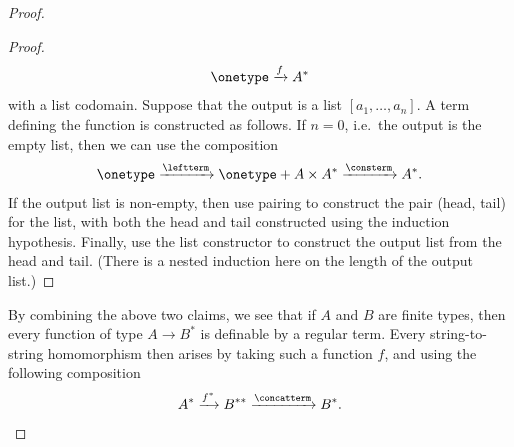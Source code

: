\begin{proof}
\begin{proof}
\begin{align*}
\onetype \xrightarrow f A^*
\end{align*}
with a list codomain. Suppose that the output is a list $[a_1,\ldots,a_n]$. A term defining the function is constructed as follows. If $n=0$, i.e.~the output is the empty list, then we can use the composition
\begin{align*}
\onetype \xrightarrow{\leftterm} \onetype + A \times A^* \xrightarrow {\consterm} A^*.
\end{align*}
If the output list is non-empty, then use pairing to construct the pair (head, tail) for the list, with both the head and tail constructed using the induction hypothesis. Finally, use the list constructor to construct the output list from the head and tail. (There is a nested induction here on the length of the output list.) 
\end{proof}

By combining the above two claims, we see that if $A$ and $B$ are finite types, then every function of type $A \to B^*$ is definable by a regular term. Every  string-to-string homomorphism  then arises by taking such a function $f$, and using the following composition
\begin{align*}
    A^* \xrightarrow{f^*} B^{**} \xrightarrow \concatterm B^*.
\end{align*}
\end{proof}

